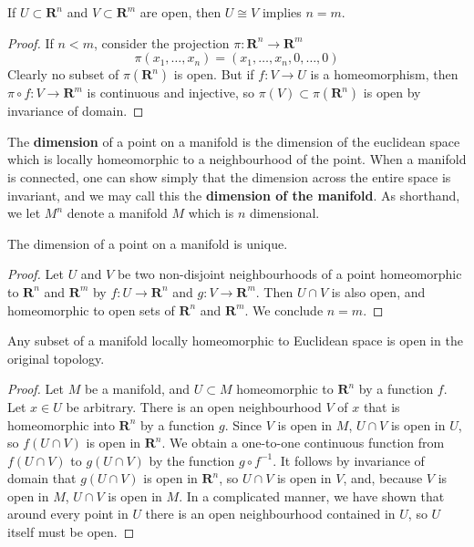 \begin{lemma}
    If $U \subset \mathbf{R}^n$ and $V \subset \mathbf{R}^m$ are open, then $U \cong V$ implies $n = m$.
\end{lemma}
\begin{proof}
    If $n < m$, consider the projection $\pi: \mathbf{R}^n \to \mathbf{R}^m$
    \[ \pi(x_1, \dots, x_n) = (x_1, \dots, x_n, 0, \dots, 0) \]
    Clearly no subset of $\pi(\mathbf{R}^n)$ is open. But if $f: V \to U$ is a homeomorphism, then $\pi \circ f: V \to \mathbf{R}^m$ is continuous and injective, so $\pi(V) \subset \pi(\mathbf{R}^n)$ is open by invariance of domain.
\end{proof}

The {\bf dimension} of a point on a manifold is the dimension of the euclidean space which is locally homeomorphic to a neighbourhood of the point. When a manifold is connected, one can show simply that the dimension across the entire space is invariant, and we may call this the {\bf dimension of the manifold}. As shorthand, we let $M^n$ denote a manifold $M$ which is $n$ dimensional.

\begin{corollary}
    The dimension of a point on a manifold is unique.
\end{corollary}
\begin{proof}
    Let $U$ and $V$ be two non-disjoint neighbourhoods of a point homeomorphic to $\mathbf{R}^n$ and $\mathbf{R}^m$ by $f:U \to \mathbf{R}^n$ and $g:V \to \mathbf{R}^m$. Then $U \cap V$ is also open, and homeomorphic to open sets of $\mathbf{R}^n$ and $\mathbf{R}^m$. We conclude $n = m$.
\end{proof}

\begin{theorem}
    Any subset of a manifold locally homeomorphic to Euclidean space is open in the original topology.
\end{theorem}
\begin{proof}
    Let $M$ be a manifold, and $U \subset M$ homeomorphic to $\mathbf{R}^n$ by a function $f$. Let $x \in U$ be arbitrary. There is an open neighbourhood $V$ of $x$ that is homeomorphic into $\mathbf{R}^n$ by a function $g$. Since $V$ is open in $M$, $U \cap V$ is open in $U$, so $f(U \cap V)$ is open in $\mathbf{R}^n$. We obtain a one-to-one continuous function from $f(U \cap V)$ to $g(U \cap V)$ by the function $g \circ f^{-1}$. It follows by invariance of domain that $g(U \cap V)$ is open in $\mathbf{R}^n$, so $U \cap V$ is open in $V$, and, because $V$ is open in $M$, $U \cap V$ is open in $M$. In a complicated manner, we have shown that around every point in $U$ there is an open neighbourhood contained in $U$, so $U$ itself must be open.
\end{proof}

